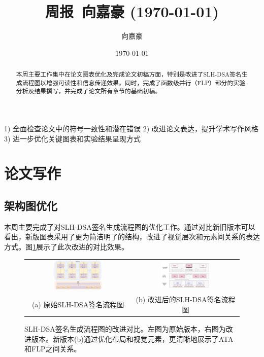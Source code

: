 \documentclass{article}
\title{周报~向嘉豪 (\today)}
\author{向嘉豪}
\date{\today}
\begin{document}
\maketitle

\begin{abstract}
  本周主要工作集中在论文图表优化及完成论文初稿方面，特别是改进了SLH-DSA签名生成流程图以增强可读性和信息传递效果。同时，完成了函数级并行（FLP）部分的实验分析及结果撰写，并完成了论文所有章节的基础初稿。
\end{abstract}

\begin{weekplan}
1) 全面检查论文中的符号一致性和潜在错误
2) 改进论文表达，提升学术写作风格
3) 进一步优化关键图表和实验结果呈现方式
\end{weekplan}

\section{论文写作}

\subsection{架构图优化}
本周主要完成了对SLH-DSA签名生成流程图的优化工作。通过对比新旧版本可以看出，新版图表采用了更为简洁明了的结构，改进了视觉层次和元素间关系的表达方式。图\ref{fig:flow_comparison}展示了此次改进的对比效果。

\begin{figure}[htb]
\centering
\begin{tabular}{cc}
\includegraphics[width=0.48\textwidth]{fig/arch_old.png} &
\includegraphics[width=0.48\textwidth]{fig/arch.png} \\
(a) 原始SLH-DSA签名流程图 & (b) 改进后的SLH-DSA签名流程图
\end{tabular}
\caption{SLH-DSA签名生成流程图的改进对比。左图为原始版本，右图为改进版本。新版本(b)通过优化布局和视觉元素，更清晰地展示了ATA和FLP之间关系。}
\label{fig:flow_comparison}
\end{figure}
\end{document}
